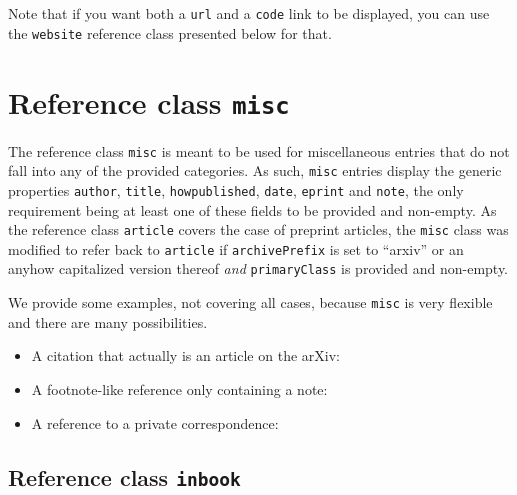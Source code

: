 \documentclass[a4paper,twocolumn,11pt]{quantumarticle}
\begin{document}
Note that if you want both a \texttt{url} and a \texttt{code} link to be displayed, you can use the \texttt{website} reference class presented below for that.


\section{Reference class \texttt{misc}}\label{sec:misc}
The reference class \texttt{misc} is meant to be used for miscellaneous entries that do not fall into any of the provided categories.
As such, \texttt{misc} entries display the generic properties \texttt{author}, \texttt{title}, \texttt{howpublished}, \texttt{date}, \texttt{eprint} and \texttt{note}, the only requirement being at least one of these fields to be provided and non-empty.
As the reference class \texttt{article} covers the case of preprint articles, the \texttt{misc} class was modified to refer back to \texttt{article} if \texttt{archivePrefix} is set to ``arxiv'' or an anyhow capitalized version thereof \emph{and} \texttt{primaryClass} is provided and non-empty.

We provide some examples, not covering all cases, because \texttt{misc} is very flexible and there are many possibilities.
\begin{itemize}
    \item A citation that actually is an article on the arXiv: 
    \item A footnote-like reference only containing a note: 
    \item A reference to a private correspondence: 
\end{itemize}




\subsection{Reference class \texttt{inbook}}\label{sec:inbook}
\end{document}
